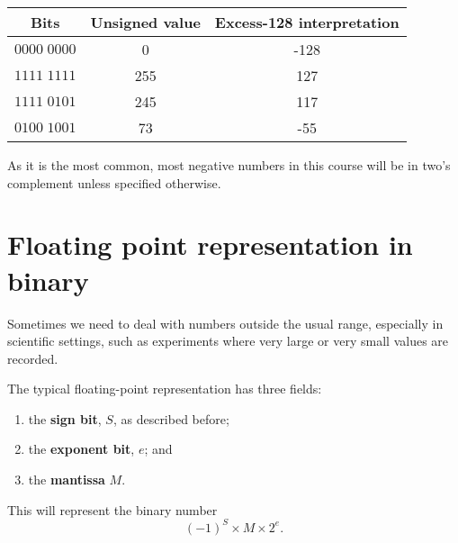 \begin{example}
    \hspace{0em}
    \begin{center}
        \begin{tabular}{ccc}
            \toprule
            Bits & Unsigned value & Excess-128 interpretation \\
            \midrule
            $0000 \; 0000$ & 0 & -128 \\
            $1111 \; 1111$ & 255 & 127 \\
            $1111 \; 0101$ & 245 & 117 \\
            $0100 \; 1001$ & 73 & -55 \\ 
            \bottomrule
        \end{tabular}
    \end{center}
\end{example}

As it is the most common, most negative numbers in this course will be in two's complement unless specified otherwise.

\section{Floating point representation in binary}

Sometimes we need to deal with numbers outside the usual range, especially in scientific settings, such as experiments where very large or very small values are recorded.

\begin{definition}
    The typical floating-point representation has three fields:
    \begin{enumerate}
        \item the \textbf{sign bit}, $S$, as described before;
        \item the \textbf{exponent bit}, $e$; and
        \item the \textbf{mantissa} $M$.
    \end{enumerate}
    This will represent the binary number \[ (-1)^{S} \times M \times 2^e. \]
\end{definition}

